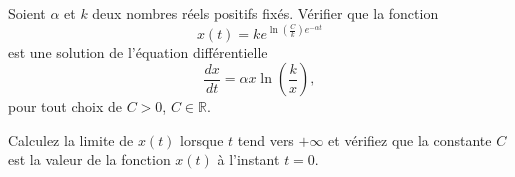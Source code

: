 \begin{exercice}\label{exoTD6A-0001}
  
Soient $\alpha$ et $k$ deux nombres réels positifs fixés. Vérifier que la fonction
\begin{equation}
  x(t)= k e^{\ln\left(\frac{C}{k}\right)e^{-\alpha t}}
\end{equation}
est une solution de l'équation différentielle 
\begin{equation}
  \frac{dx}{dt}=\alpha x\ln\left(\frac{k}{x}\right),
\end{equation}
pour tout choix de $C>0$, $C\in\mathbb{R}$. 

Calculez la limite de $x(t)$ lorsque $t$ tend vers $+\infty$ et vérifiez que la constante $C$ est la valeur de la fonction $x(t)$ à l'instant $t=0$.
  

\end{exercice}
